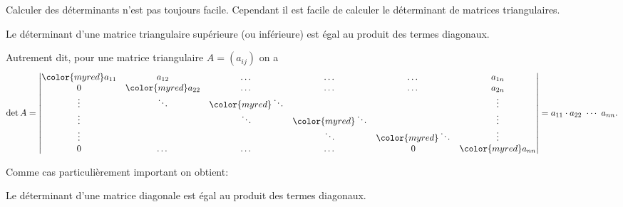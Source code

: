 \documentclass[class=report,crop=false]{standalone}
\begin{document}
Calculer des déterminants n'est pas toujours facile.
Cependant il est facile de calculer le déterminant de matrices triangulaires.

\begin{proposition}
\label{prop:dettriang}
Le déterminant d'une matrice triangulaire supérieure (ou inférieure)
est égal au produit des termes diagonaux.

\end{proposition}

Autrement dit, pour une matrice triangulaire $A = (a_{ij})$  on a
$$\det A = \begin{vmatrix}
{\color{myred}a_{11}} & a_{12} &\dots&\dots&\dots & a_{1n}\\
0&{\color{myred}a_{22}}&\dots&\dots&\dots&a_{2n}\\
\vdots&\ddots&{\color{myred}\ddots}&&&\vdots\\
\vdots&&\ddots&{\color{myred}\ddots}&&\vdots\\
\vdots & &&\ddots&{\color{myred}\ddots}&\vdots\\
0&\dots&\dots&\dots&0&{\color{myred}a_{nn}}
  \end{vmatrix} = a_{11}\cdot a_{22} \ \cdots\  a_{nn}.
$$

Comme cas particulièrement important on obtient:
\begin{corollaire}
Le déterminant d'une matrice diagonale est égal au produit des termes diagonaux.
\end{corollaire}
\end{document}
